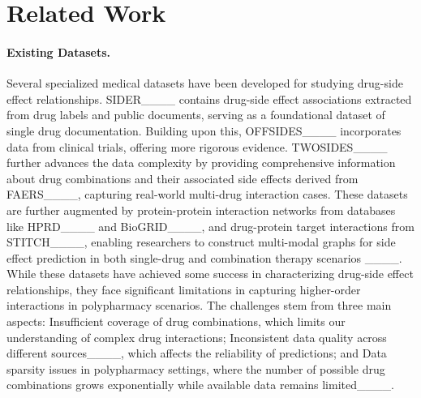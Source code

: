 \section{Related Work}
\label{sec:related}
\paragraph{Existing Datasets.} Several specialized medical datasets have been developed for studying drug-side effect relationships. SIDER____ contains drug-side effect associations extracted from drug labels and public documents, serving as a foundational dataset of single drug documentation. Building upon this, OFFSIDES____ incorporates data from clinical trials, offering more rigorous evidence. TWOSIDES____ further advances the data complexity by providing comprehensive information about drug combinations and their associated side effects derived from FAERS____, capturing real-world multi-drug interaction cases. These datasets are further augmented by protein-protein interaction networks from databases like HPRD____ and BioGRID____, and drug-protein target interactions from STITCH____, enabling researchers to construct multi-modal graphs for side effect prediction in both single-drug and combination therapy scenarios ____. While these datasets have achieved some success in characterizing drug-side effect relationships, they face significant limitations in capturing higher-order interactions in polypharmacy scenarios. The challenges stem from three main aspects:  Insufficient coverage of drug combinations, which limits our understanding of complex drug interactions;  Inconsistent data quality across different sources____, which affects the reliability of predictions; and  Data sparsity issues in polypharmacy settings, where the number of possible drug combinations grows exponentially while available data remains limited____.



